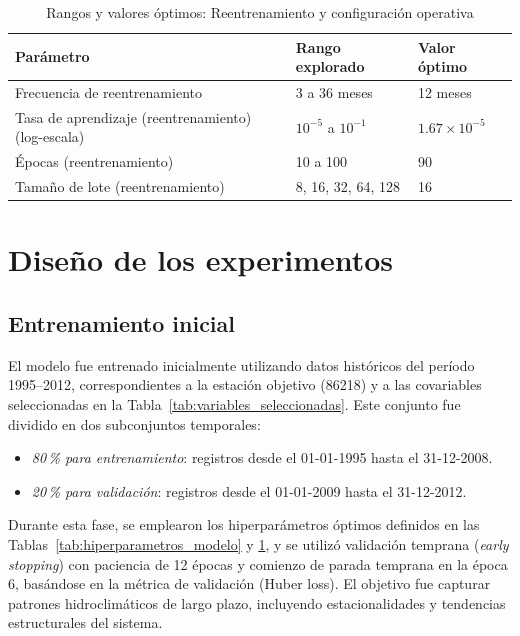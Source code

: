 \begin{table}[h]
  \centering
  \caption{Rangos y valores óptimos: Reentrenamiento y configuración operativa}
  \label{tab:hiperparametros_reentreno}
  \begin{tabular}{@{}lll@{}}
    \toprule
    \textbf{Parámetro}                                & \textbf{Rango explorado}          & \textbf{Valor óptimo} \\ \midrule
    Frecuencia de reentrenamiento                      & 3 a 36 meses                        & 12 meses              \\
    Tasa de aprendizaje (reentrenamiento) (log-escala) & $10^{-5}$ a $10^{-1}$               & $1.67 \times 10^{-5}$ \\
    Épocas (reentrenamiento)                           & 10 a 100                            & 90                    \\
    Tamaño de lote (reentrenamiento)                    & 8, 16, 32, 64, 128                  & 16                    \\ \bottomrule
  \end{tabular}
\end{table}


\section{Diseño de los experimentos} \label{sec:diseno_experimentos}

\subsection{Entrenamiento inicial}
El modelo fue entrenado inicialmente utilizando datos históricos del período 1995–2012, correspondientes a la estación objetivo (86218) y a las covariables seleccionadas en la Tabla~\ref{tab:variables_seleccionadas}. Este conjunto fue dividido en dos subconjuntos temporales:
\begin{itemize}
  \item \emph{80\,\% para entrenamiento}: registros desde el 01-01-1995 hasta el 31-12-2008.
  \item \emph{20\,\% para validación}: registros desde el 01-01-2009 hasta el 31-12-2012.
\end{itemize}
Durante esta fase, se emplearon los hiperparámetros óptimos definidos en las Tablas~\ref{tab:hiperparametros_modelo} y \ref{tab:hiperparametros_reentreno}, y se utilizó validación temprana (\textit{early stopping}) con paciencia de 12 épocas y comienzo de parada temprana en la época 6, basándose en la métrica de validación (Huber loss). El objetivo fue capturar patrones hidroclimáticos de largo plazo, incluyendo estacionalidades y tendencias estructurales del sistema.

